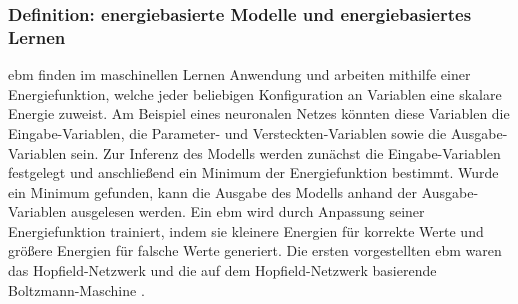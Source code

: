 \subsubsection{Definition: energiebasierte Modelle und energiebasiertes Lernen}

\gls{ebm} finden im maschinellen Lernen Anwendung und arbeiten mithilfe einer Energiefunktion, welche jeder beliebigen Konfiguration an Variablen eine skalare Energie zuweist. Am Beispiel eines neuronalen Netzes könnten diese Variablen die Eingabe-Variablen, die Parameter- und Versteckten-Variablen sowie die Ausgabe-Variablen sein. Zur Inferenz des Modells werden zunächst die Eingabe-Variablen festgelegt und anschließend ein Minimum der Energiefunktion bestimmt. Wurde ein Minimum gefunden, kann die Ausgabe des Modells anhand der Ausgabe-Variablen ausgelesen werden. Ein \ac{ebm} wird durch Anpassung seiner Energiefunktion trainiert, indem sie kleinere Energien für korrekte Werte und größere Energien für falsche Werte generiert. \cite{Lecun2006} Die ersten vorgestellten \ac{ebm} waren das Hopfield-Netzwerk \cite{Hopfield1984} und die auf dem Hopfield-Netzwerk basierende Boltzmann-Maschine \cite{Ackley1985}.
